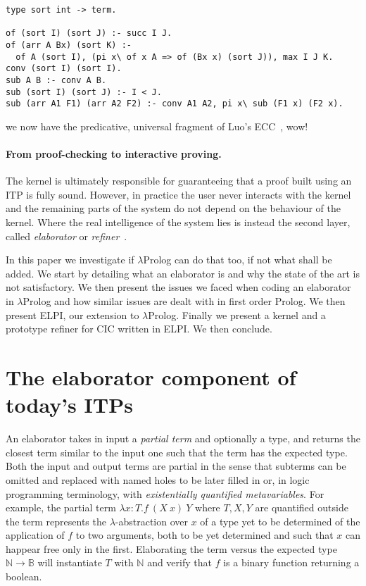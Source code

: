 \documentclass{easychair}
\begin{document}
\begin{verbatim}
type sort int -> term.

of (sort I) (sort J) :- succ I J.
of (arr A Bx) (sort K) :-
  of A (sort I), (pi x\ of x A => of (Bx x) (sort J)), max I J K.
conv (sort I) (sort I).
sub A B :- conv A B.
sub (sort I) (sort J) :- I < J.
sub (arr A1 F1) (arr A2 F2) :- conv A1 A2, pi x\ sub (F1 x) (F2 x).
\end{verbatim}

\noindent
we now have the predicative, universal fragment of Luo's ECC~\cite{luo}, wow!


\paragraph{From proof-checking to interactive proving.}

The kernel is ultimately responsible for guaranteeing that a proof
built using an ITP is fully sound. However, in practice the user never
interacts with the kernel and the remaining parts of the system do not
depend on the behaviour of the kernel. Where the real intelligence of
the system lies is instead the second layer, called \emph{elaborator}
or \emph{refiner}~\cite{??,??,??}.


In this paper we investigate if $\lambda$Prolog can do that too, if not
what shall be added.  We start by detailing what an elaborator is and
why the state of the art is not satisfactory.  We then present the
issues
we faced when coding an elaborator in $\lambda$Prolog and how similar issues are
dealt with in first order Prolog.  We then present ELPI, our extension to
$\lambda$Prolog.  Finally we present a kernel and a prototype refiner for CIC
written in ELPI.  We then conclude.

\section{The elaborator component of today's ITPs}

An elaborator takes in input a \emph{partial term} and optionally a
type, and returns the closest term similar to the input one such that
the term has the expected type. Both the input and output terms are
partial in the sense that subterms can be omitted and replaced with
named holes to be later filled in or, in logic programming
terminology, with \emph{existentially quantified metavariables}. For
example, the partial term $\lambda x: T. f~(X~x)~Y$ where $T,X,Y$ are
quantified outside the term represents the $\lambda$-abstraction over
$x$ of a type yet to be determined of the application of $f$ to two
arguments, both to be yet determined and such that $x$ can happear
free only in the first. Elaborating the term versus the expected type
$\mathbb{N} \to \mathbb{B}$ will instantiate $T$ with $\mathbb{N}$ and
verify that $f$ is a binary function returning a boolean.
\end{document}

